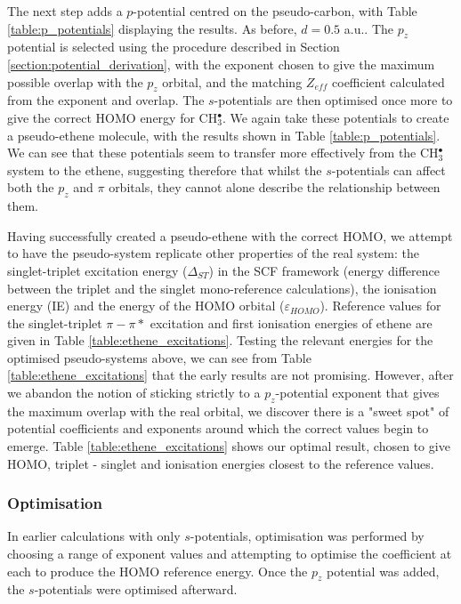\documentclass[aip]{revtex4-1}
\begin{document}
The next step adds a \(p\)-potential centred on the pseudo-carbon, with Table \ref{table:p_potentials} displaying the results. As before, \(d = 0.5\) a.u.. The \(p_{z}\) potential is selected using the procedure described in Section \ref{section:potential_derivation}, with the exponent chosen to give the maximum possible overlap with the \(p_{z}\) orbital, and the matching \(Z_{eff}\) coefficient calculated from the exponent and overlap. The \(s\)-potentials are then optimised once more to give the correct HOMO energy for CH\(^{\bullet}_{3}\). We again take these potentials to create a pseudo-ethene molecule, with the results shown in Table \ref{table:p_potentials}. We can see that these potentials seem to transfer more effectively from the CH\(^{\bullet}_{3}\) system to the ethene, suggesting therefore that whilst the \(s\)-potentials can affect both the \(p_{z}\) and \(\pi\) orbitals, they 
cannot alone describe the relationship between them.

Having successfully created a pseudo-ethene with the correct HOMO, we attempt to have the pseudo-system replicate other properties of the real system:
the singlet-triplet excitation energy ($\Delta_{ST}$) in the SCF framework (energy difference between the triplet and the singlet mono-reference
calculations), the ionisation energy (IE) and the energy of the HOMO orbital ($\varepsilon_{HOMO}$). Reference values for the singlet-triplet \(\pi-\pi*\) excitation and first ionisation energies of ethene are given in Table \ref{table:ethene_excitations}. Testing the relevant energies for the optimised pseudo-systems above, we can see from Table \ref{table:ethene_excitations} that the early results are not promising. However, after we abandon the notion of sticking strictly to a \(p_{z}\)-potential exponent that gives the maximum overlap with the real orbital, we discover there is a "sweet spot" of potential coefficients and exponents around which the correct values begin to emerge. Table \ref{table:ethene_excitations} shows our optimal result, chosen to give HOMO, triplet - singlet and ionisation energies closest to the reference values. 

\subsubsection{Optimisation}

In earlier calculations with only \(s\)-potentials, optimisation was performed by choosing a range of exponent values and attempting to optimise the coefficient at each to produce the HOMO reference energy. Once the \(p_{z}\) potential was added, the \(s\)-potentials were optimised afterward. 
\end{document}
